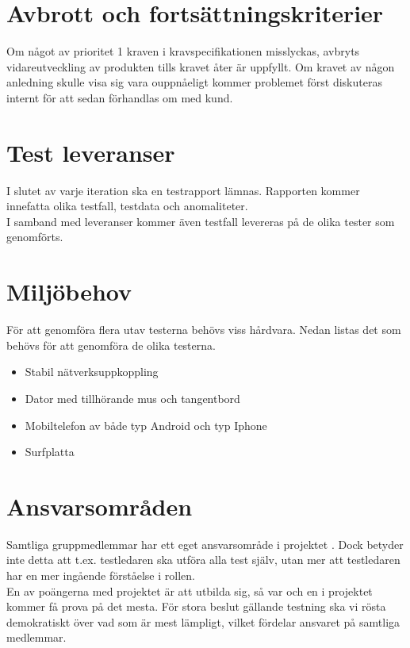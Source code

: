 \section{Avbrott och fortsättningskriterier}
	Om något av prioritet 1 kraven i kravspecifikationen \cite{bib-kravspec} misslyckas, avbryts vidareutveckling av produkten tills kravet åter är uppfyllt. Om kravet av någon anledning skulle visa sig vara ouppnåeligt kommer problemet först diskuteras internt för att sedan förhandlas om med kund.



\section{Test leveranser}
	I slutet av varje iteration ska en testrapport lämnas. Rapporten kommer innefatta olika testfall, testdata och anomaliteter.\\

	I samband med leveranser kommer även testfall levereras på de olika tester som genomförts.




\section{Miljöbehov}
	För att genomföra flera utav testerna behövs viss hårdvara. Nedan listas det som behövs för att genomföra de olika testerna.

	\begin{itemize}
	\item Stabil nätverksuppkoppling
	\item Dator med tillhörande mus och tangentbord
	\item Mobiltelefon av både typ Android och typ Iphone
	\item Surfplatta
	\end{itemize}

\section{Ansvarsområden}
	Samtliga gruppmedlemmar har ett eget ansvarsområde i projektet \cite{bib-projektplan}. Dock betyder inte detta att t.ex. testledaren ska utföra alla test själv, utan mer att testledaren har en mer ingående förståelse i rollen.\\

	En av poängerna med projektet är att utbilda sig, så var och en i projektet kommer få prova på det mesta. För stora beslut gällande testning ska vi rösta demokratiskt över vad som är mest lämpligt, vilket fördelar ansvaret på samtliga medlemmar.


